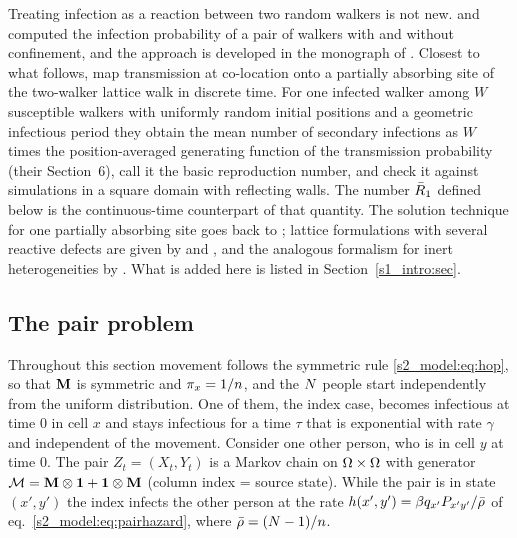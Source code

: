 Treating infection as a reaction between two random walkers is not new. \citet{kenkre2014theory} and
\citet{sugaya2018analysis} computed the infection probability of a pair of walkers with and without
confinement, and the approach is developed in the monograph of \citet{kenkre2021theory}. Closest to what
follows, \citet{giuggioli2022spatio} map transmission at co-location onto a partially absorbing site of the
two-walker lattice walk in discrete time. For one infected walker among $W$ susceptible walkers with
uniformly random initial positions and a geometric infectious period they obtain the mean number of
secondary infections as $W$ times the position-averaged generating function of the transmission
probability (their Section~6), call it the basic reproduction number, and check it against simulations in a
square domain with reflecting walls. The number $\bar{R}_1$ defined below is the continuous-time counterpart
of that quantity. The solution technique for one partially absorbing site goes back to
\citet{szabo1984localized}; lattice formulations with several reactive defects are given by
\citet{giuggioli2020exact} and \citet{giuggioli2022spatio}, and the analogous formalism for inert
heterogeneities by \citet{sarvaharman2023particle}. What is added here is listed in Section~\ref{s1_intro:sec}.

\subsection{The pair problem}\label{s5_pair:sec:pair}

Throughout this section movement follows the symmetric rule \eqref{s2_model:eq:hop}, so that $\mathbf{M}$ is
symmetric and $\pi_x=1/n$, and the $N$ people start independently from the uniform distribution.
One of them, the index case, becomes infectious at time $0$ in cell $x$ and stays infectious for a time
$\tau$ that is exponential with rate $\gamma$ and independent of the movement. Consider one other person,
who is in cell $y$ at time $0$. The pair $Z_t=(X_t,Y_t)$ is a Markov chain on $\Omega\times\Omega$ with
generator $\mathcal{M}=\mathbf{M}\otimes\mathbf{1}+\mathbf{1}\otimes\mathbf{M}$ (column index = source state). While the pair is in
state $(x',y')$ the index infects the other person at the rate $h(x',y')=\beta q_{x'}P_{x'y'}/\bar{\rho}$ of
eq.~\eqref{s2_model:eq:pairhazard}, where $\bar{\rho}=(N-1)/n$.

